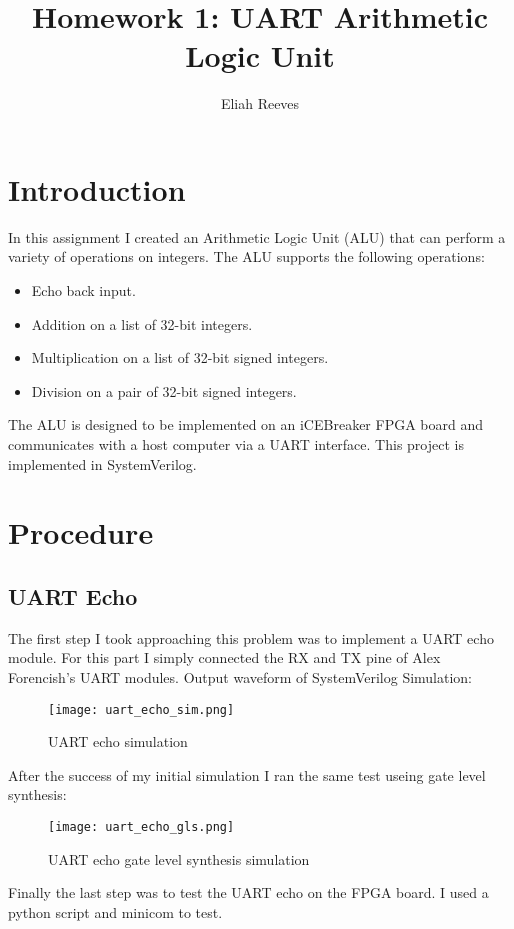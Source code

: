 \documentclass{article}
\title{Homework 1: UART Arithmetic Logic Unit}
\author{{Eliah Reeves}}
\date{\vspace{-5ex}} %
\begin{document}
\maketitle
\thispagestyle{firstpage}
\section{Introduction}

In this assignment I created an Arithmetic Logic Unit (ALU) that can perform a variety of operations on integers. The ALU supports the following operations:
\begin{itemize}
  \item Echo back input.
  \item Addition on a list of 32-bit integers.
  \item Multiplication on a list of 32-bit signed integers.
  \item Division on a pair of 32-bit signed integers.
\end{itemize}
The ALU is designed to be implemented on an iCEBreaker FPGA board and communicates with a host computer via a UART interface. This project is implemented in SystemVerilog.
\section{Procedure}
\subsection{UART Echo}
The first step I took approaching this problem was to implement a UART echo module. For this part I simply connected the RX and TX pine of Alex Forencish's UART modules.
Output waveform of SystemVerilog Simulation:

\begin{figure}[h]
  \centering
  \texttt{[image: uart\_echo\_sim.png]}
  \caption{UART echo simulation}
\end{figure}
\newpage
After the success of my initial simulation I ran the same test useing gate level synthesis:

\begin{figure}[h]
  \centering
  \texttt{[image: uart\_echo\_gls.png]}
  \caption{UART echo gate level synthesis simulation}
\end{figure}

Finally the last step was to test the UART echo on the FPGA board. I used a python script and minicom to test.
\end{document}
